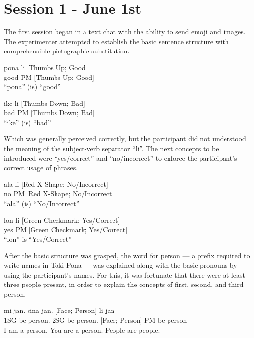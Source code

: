\documentclass[a4paper,10pt]{article}
\begin{document}
\section{Session 1 - June 1st}
The first session began in a text chat with the ability to send emoji
and images. The experimenter attempted to establish the basic sentence
structure with comprehensible pictographic substitution.

\begin{exe}
 \ex
 \gll pona li [Thumbs Up; Good] \\
 good PM [Thumbs Up; Good] \\
 \glt ``pona'' (is) ``good''
\end{exe}
\begin{exe}
 \ex
 \gll ike li [Thumbs Down; Bad] \\
 bad PM [Thumbs Down; Bad] \\
 \glt ``ike'' (is) ``bad''
\end{exe}

Which was generally perceived correctly, but the participant
did not understood the meaning of the subject-verb separator ``li''.
The next concepts to be introduced were ``yes/correct'' and ``no/incorrect''
to enforce the participant's correct usage of phrases.

\begin{exe}
 \ex
 \gll ala li [Red X-Shape; No/Incorrect] \\
 no PM [Red X-Shape; No/Incorrect] \\
 \glt ``ala'' (is) ``No/Incorrect''
\end{exe}
\begin{exe}
 \ex
 \gll lon li [Green Checkmark; Yes/Correct] \\
 yes PM [Green Checkmark; Yes/Correct] \\
 \glt ``lon'' is ``Yes/Correct''
\end{exe}

After the basic structure was grasped, the word for person --- a prefix
required to write names in Toki Pona --- was explained along with the
basic pronouns by using the participant's names. For this, it was
fortunate that there were at least three people present, in order to
explain the concepts of first, second, and third person.

\begin{exe}
 \ex
 \gll mi jan. sina jan. [Face; Person] li jan \\
 1SG be-person. 2SG be-person. [Face; Person] PM be-person \\
 \glt I am a person. You are a person. People are people.
\end{exe}
\end{document}
